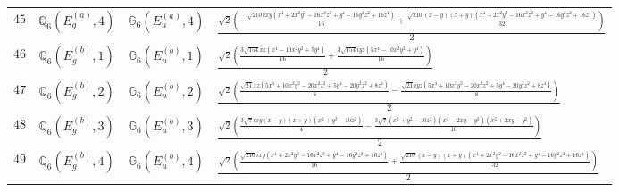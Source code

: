 \documentclass[fleqn,8pt,landscape]{jsarticle}
\begin{document}
\begin{table}[ht!]
\begin{center}
\begin{tabular}{cccl}
$ 45 $ & $ \mathbb{Q}_{6}(E_{g}^{(a)},4) $ & $ \mathbb{G}_{6}(E_{u}^{(a)},4) $ & $ \frac{\sqrt{2} \left(- \frac{\sqrt{210} i x y \left(x^{4} + 2 x^{2} y^{2} - 16 x^{2} z^{2} + y^{4} - 16 y^{2} z^{2} + 16 z^{4}\right)}{16} + \frac{\sqrt{210} \left(x - y\right) \left(x + y\right) \left(x^{4} + 2 x^{2} y^{2} - 16 x^{2} z^{2} + y^{4} - 16 y^{2} z^{2} + 16 z^{4}\right)}{32}\right)}{2} $ \\
$ 46 $ & $ \mathbb{Q}_{6}(E_{g}^{(b)},1) $ & $ \mathbb{G}_{6}(E_{u}^{(b)},1) $ & $ \frac{\sqrt{2} \left(\frac{3 \sqrt{154} x z \left(x^{4} - 10 x^{2} y^{2} + 5 y^{4}\right)}{16} + \frac{3 \sqrt{154} i y z \left(5 x^{4} - 10 x^{2} y^{2} + y^{4}\right)}{16}\right)}{2} $ \\
$ 47 $ & $ \mathbb{Q}_{6}(E_{g}^{(b)},2) $ & $ \mathbb{G}_{6}(E_{u}^{(b)},2) $ & $ \frac{\sqrt{2} \left(\frac{\sqrt{21} x z \left(5 x^{4} + 10 x^{2} y^{2} - 20 x^{2} z^{2} + 5 y^{4} - 20 y^{2} z^{2} + 8 z^{4}\right)}{8} - \frac{\sqrt{21} i y z \left(5 x^{4} + 10 x^{2} y^{2} - 20 x^{2} z^{2} + 5 y^{4} - 20 y^{2} z^{2} + 8 z^{4}\right)}{8}\right)}{2} $ \\
$ 48 $ & $ \mathbb{Q}_{6}(E_{g}^{(b)},3) $ & $ \mathbb{G}_{6}(E_{u}^{(b)},3) $ & $ \frac{\sqrt{2} \left(\frac{3 \sqrt{7} i x y \left(x - y\right) \left(x + y\right) \left(x^{2} + y^{2} - 10 z^{2}\right)}{4} - \frac{3 \sqrt{7} \left(x^{2} + y^{2} - 10 z^{2}\right) \left(x^{2} - 2 x y - y^{2}\right) \left(x^{2} + 2 x y - y^{2}\right)}{16}\right)}{2} $ \\
$ 49 $ & $ \mathbb{Q}_{6}(E_{g}^{(b)},4) $ & $ \mathbb{G}_{6}(E_{u}^{(b)},4) $ & $ \frac{\sqrt{2} \left(\frac{\sqrt{210} i x y \left(x^{4} + 2 x^{2} y^{2} - 16 x^{2} z^{2} + y^{4} - 16 y^{2} z^{2} + 16 z^{4}\right)}{16} + \frac{\sqrt{210} \left(x - y\right) \left(x + y\right) \left(x^{4} + 2 x^{2} y^{2} - 16 x^{2} z^{2} + y^{4} - 16 y^{2} z^{2} + 16 z^{4}\right)}{32}\right)}{2} $ \\
 \hline \hline
\end{tabular}
\end{center}
\end{table}
\end{document}

